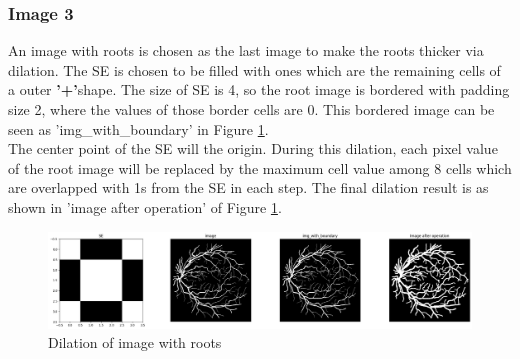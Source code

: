 \documentclass{article}
\begin{document}
\subsubsection{Image 3}
An image with roots is chosen as the last image to make the roots thicker via dilation. The SE is chosen to be filled with ones which are the remaining cells of a outer \textbf{'+'}shape. The size of SE is 4, so the root image is bordered with padding size 2, where the values of those border cells are 0. This bordered image can be seen as 'img\_with\_boundary' in Figure \ref{fig:roots}. \\
The center point of the SE will the origin. During this dilation, each pixel value of the root image will be replaced by the maximum cell value among 8 cells which are overlapped with 1s from the SE in each step. The final dilation result is as shown in 'image after operation' of Figure \ref{fig:roots}.\\
\begin{figure}[h!]
\includegraphics[width=\linewidth]{images/roots_dilated.png}
\caption{Dilation of image with roots}
\label{fig:roots}
\end{figure}
\\
\end{document}
